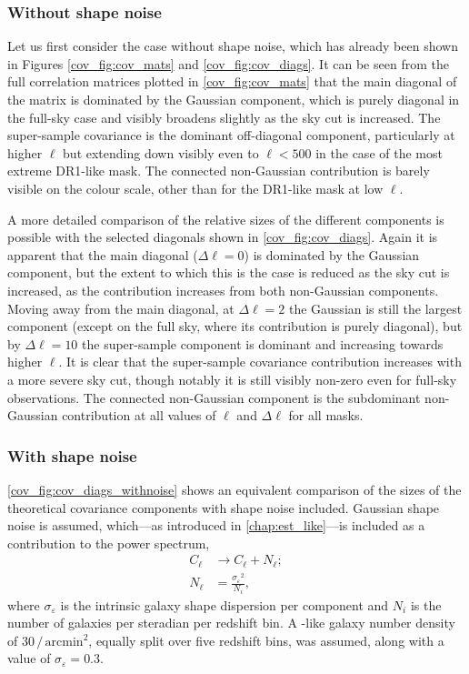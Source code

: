 \subsubsection{Without shape noise}

Let us first consider the case without shape noise, which has already been shown in Figures \ref{cov_fig:cov_mats} and \ref{cov_fig:cov_diags}.
It can be seen from the full correlation matrices plotted in \autoref{cov_fig:cov_mats} that the main diagonal of the matrix is dominated by the Gaussian component, which is purely diagonal in the full-sky case and visibly broadens slightly as the sky cut is increased. The super-sample covariance is the dominant off-diagonal component, particularly at higher $\ell$ but extending down visibly even to $\ell < 500$ in the case of the most extreme \Euclid{} DR1-like mask. The connected non-Gaussian contribution is barely visible on the colour scale, other than for the \Euclid{} DR1-like mask at low $\ell$.

A more detailed comparison of the relative sizes of the different components is possible with the selected diagonals shown in \autoref{cov_fig:cov_diags}. Again it is apparent that the main diagonal ($\Delta \ell = 0$) is dominated by the Gaussian component, but the extent to which this is the case is reduced as the sky cut is increased, as the contribution increases from both non-Gaussian components.
Moving away from the main diagonal, at $\Delta \ell = 2$ the Gaussian is still the largest component (except on the full sky, where its contribution is purely diagonal), but by $\Delta \ell = 10$ the super-sample component is dominant and increasing towards higher $\ell$.
It is clear that the super-sample covariance contribution increases with a more severe sky cut, though notably it is still visibly non-zero even for full-sky observations. The connected non-Gaussian component is the subdominant non-Gaussian contribution at all values of $\ell$ and $\Delta \ell$ for all masks.

\subsubsection{With shape noise}

\autoref{cov_fig:cov_diags_withnoise} shows an equivalent comparison of the sizes of the theoretical covariance components with shape noise included.
Gaussian shape noise is assumed, which---as introduced in \autoref{chap:est_like}---is included as a contribution to the power spectrum,
\begin{align}
C_\ell &\rightarrow C_\ell + N_\ell; \\
N_\ell &= \frac{{\sigma_\varepsilon}^2}{N_i},
\label{cov_eqn:nl}
\end{align}
where $\sigma_\varepsilon$ is the intrinsic galaxy shape dispersion per component and $N_i$ is the number of galaxies per steradian per redshift bin. A \Euclid{}-like galaxy number density of $30\,/\,\text{arcmin}^2$, equally split over five redshift bins, was assumed, along with a value of $\sigma_\varepsilon = 0.3$.

